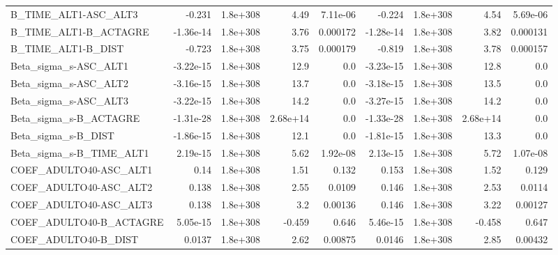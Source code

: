 \begin{tabular}{lrrrrrrrr}
B\_TIME\_ALT1-ASC\_ALT3              &      -0.231 &     1.8e+308 &      4.49 & 7.11e-06 &     -0.224 &    1.8e+308 &         4.54 &      5.69e-06 \\
B\_TIME\_ALT1-B\_ACTAGRE             &   -1.36e-14 &     1.8e+308 &      3.76 & 0.000172 &  -1.28e-14 &    1.8e+308 &         3.82 &      0.000131 \\
B\_TIME\_ALT1-B\_DIST                &      -0.723 &     1.8e+308 &      3.75 & 0.000179 &     -0.819 &    1.8e+308 &         3.78 &      0.000157 \\
Beta\_sigma\_s-ASC\_ALT1             &   -3.22e-15 &     1.8e+308 &      12.9 &      0.0 &  -3.23e-15 &    1.8e+308 &         12.8 &           0.0 \\
Beta\_sigma\_s-ASC\_ALT2             &   -3.16e-15 &     1.8e+308 &      13.7 &      0.0 &  -3.18e-15 &    1.8e+308 &         13.5 &           0.0 \\
Beta\_sigma\_s-ASC\_ALT3             &   -3.22e-15 &     1.8e+308 &      14.2 &      0.0 &  -3.27e-15 &    1.8e+308 &         14.2 &           0.0 \\
Beta\_sigma\_s-B\_ACTAGRE            &   -1.31e-28 &     1.8e+308 &  2.68e+14 &      0.0 &  -1.33e-28 &    1.8e+308 &     2.68e+14 &           0.0 \\
Beta\_sigma\_s-B\_DIST               &   -1.86e-15 &     1.8e+308 &      12.1 &      0.0 &  -1.81e-15 &    1.8e+308 &         13.3 &           0.0 \\
Beta\_sigma\_s-B\_TIME\_ALT1          &    2.19e-15 &     1.8e+308 &      5.62 & 1.92e-08 &   2.13e-15 &    1.8e+308 &         5.72 &      1.07e-08 \\
COEF\_ADULTO40-ASC\_ALT1            &        0.14 &     1.8e+308 &      1.51 &    0.132 &      0.153 &    1.8e+308 &         1.52 &         0.129 \\
COEF\_ADULTO40-ASC\_ALT2            &       0.138 &     1.8e+308 &      2.55 &   0.0109 &      0.146 &    1.8e+308 &         2.53 &        0.0114 \\
COEF\_ADULTO40-ASC\_ALT3            &       0.138 &     1.8e+308 &       3.2 &  0.00136 &      0.146 &    1.8e+308 &         3.22 &       0.00127 \\
COEF\_ADULTO40-B\_ACTAGRE           &    5.05e-15 &     1.8e+308 &    -0.459 &    0.646 &   5.46e-15 &    1.8e+308 &       -0.458 &         0.647 \\
COEF\_ADULTO40-B\_DIST              &      0.0137 &     1.8e+308 &      2.62 &  0.00875 &     0.0146 &    1.8e+308 &         2.85 &       0.00432 \\

\end{tabular}
